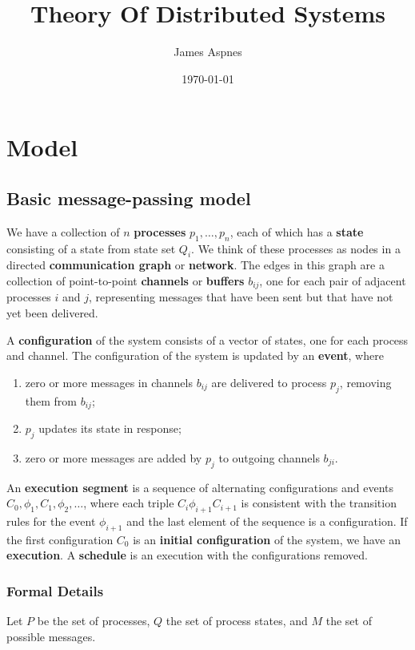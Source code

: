\documentclass[11pt]{article}
\author{James Aspnes}
\date{\today}
\title{Theory Of Distributed Systems}
\begin{document}
\maketitle
\tableofcontents

\section{Model}
\label{sec:org0c30293}
\subsection{Basic message-passing model}
\label{sec:org23b584a}
We have a collection of \(n\) \textbf{processes} \(p_1,\dots,p_n\), each of which has a \textbf{state} consisting of a state
from state set \(Q_i\). We think of these processes as nodes in a directed \textbf{communication graph} or
\textbf{network}. The edges in this graph are a collection of point-to-point \textbf{channels} or \textbf{buffers} \(b_{ij}\),
one for each pair of adjacent processes \(i\) and \(j\), representing messages that have been sent but
that have not yet been delivered.

A \textbf{configuration} of the system consists of a vector of states, one for each process and channel. The
configuration of the system is updated by an \textbf{event}, where
\begin{enumerate}
\item zero or more messages in channels \(b_{ij}\) are delivered to process \(p_j\), removing them from
\(b_{ij}\);
\item \(p_j\) updates its state in response;
\item zero or more messages are added by \(p_j\) to outgoing channels \(b_{ji}\).
\end{enumerate}

An \textbf{execution segment} is a sequence of alternating configurations and events \(C_0,\phi_1,C_1,\phi_2,\dots\), where
each triple \(C_i\phi_{i+1}C_{i+1}\) is consistent with the transition rules for the event \(\phi_{i+1}\) and
the last element of the sequence is a configuration. If the first configuration \(C_0\) is an \textbf{initial
configuration} of the system, we have an \textbf{execution}. A \textbf{schedule} is an execution with the configurations
removed.
\subsubsection{Formal Details}
\label{sec:org7935ca2}
Let \(P\) be the set of processes, \(Q\) the set of process states, and \(M\) the set of possible
messages.
\end{document}
